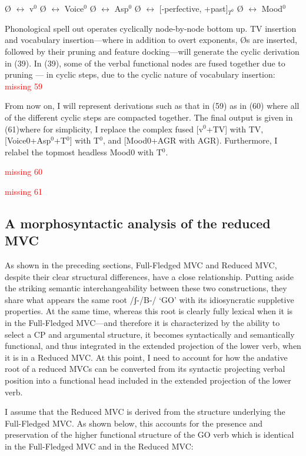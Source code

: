 \documentclass[output=paper,colorlinks,citecolor=brown,
]{langscibook}
\begin{document}
\ea
    \ea Ø $\longleftrightarrow$ v$^0$
    \ex Ø $\longleftrightarrow$ Voice$^0$
    \ex Ø $\longleftrightarrow$ Asp$^0$
    \ex Ø $\longleftrightarrow$ [-perfective, +past]$_{T^0}$
    \ex Ø $\longleftrightarrow$ Mood$^0$
    \z
\z

Phonological spell out operates cyclically node-by-node bottom up.  TV insertion and vocabulary insertion—where in addition to overt exponents, Øs are inserted, followed by their pruning and feature docking—will generate the cyclic derivation in (39). In (39), some of the verbal functional nodes are fused together due to pruning — in cyclic steps, due to the cyclic nature of vocabulary insertion: 
\ea
\textcolor{red}{missing 59}
\z

From now on, I will represent derivations such as that in (59) as in (60) where all of the different cyclic steps are compacted together.  The final output is given in (61)where for simplicity, I replace the complex fused [v$^0$+TV] with TV, [Voice0+Asp$^0$+T$^0$] with T$^0$, and  [Mood0+AGR with AGR).  Furthermore, I relabel the topmost headless Mood0 with T$^0$.

\ea
\textcolor{red}{missing 60}
\z

\ea
\textcolor{red}{missing 61}
\z

\subsection{A morphosyntactic analysis of the reduced MVC}

As shown in the preceding sections, Full-Fledged MVC and Reduced MVC, despite their clear structural differences, have a close relationship. Putting aside the striking semantic interchangeability between these two constructions, they share what appears the same root /ʃ-/B-/ ‘GO’ with its idiosyncratic suppletive properties. At the same time, whereas this root is clearly fully lexical when it is in the  Full-Fledged MVC—and therefore it is characterized by the ability to select a CP and argumental structure, it becomes syntactically and semantically functional, and thus integrated in the extended projection of the lower verb, when it is in a Reduced MVC.  At this point, I need to account for how the andative root of a reduced MVCs can be converted from its syntactic projecting verbal position into a functional head included in the extended projection of the lower verb.

I assume that the Reduced MVC is derived from the structure underlying the Full-Fledged MVC. As shown below, this accounts for the presence and preservation of the higher functional structure of the GO verb which is identical in the Full-Fledged MVC and in the Reduced MVC:
\end{document}
